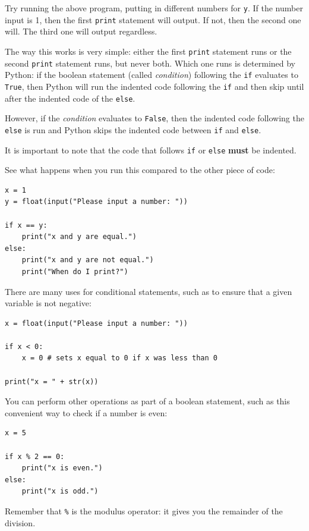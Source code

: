 \documentclass[11pt]{cselabheader}
\begin{document}
Try running the above program, putting in different numbers for \lstinline{y}.
If the number input is 1, then the first \lstinline!print! statement will
output. If not, then the second one will. The third one will output regardless.

The way this works is very simple: either the first \lstinline!print! statement
runs or the second \lstinline!print! statement runs, but never both. Which one
runs is determined by Python: if the boolean statement (called \emph{condition})
following the \lstinline!if! evaluates to \lstinline!True!, then Python will
run the indented code following the \lstinline!if! and then skip until after
the indented code of the \lstinline!else!.

However, if the \emph{condition} evaluates to \lstinline!False!, then the
indented code following the \lstinline!else! is run and Python skips the
indented code between \lstinline!if! and \lstinline!else!.

It is important to note that the code that follows \lstinline!if! or
\lstinline!else! \textbf{must} be indented.

See what happens when you run this compared to the other piece of code:
\begin{lstlisting}
x = 1
y = float(input("Please input a number: "))

if x == y:
    print("x and y are equal.")
else:
    print("x and y are not equal.")
    print("When do I print?")
\end{lstlisting}

There are many uses for conditional statements, such as to ensure that a given
variable is not negative:

\begin{lstlisting}[style=python]
x = float(input("Please input a number: "))

if x < 0:
    x = 0 # sets x equal to 0 if x was less than 0

print("x = " + str(x))
\end{lstlisting}

You can perform other operations as part of a boolean statement, such as this convenient way to check if a number is even:

\begin{lstlisting}[style=python]
x = 5

if x % 2 == 0:
    print("x is even.")
else:
    print("x is odd.")
\end{lstlisting}

Remember that \lstinline!%! 
is the modulus operator: it gives you the remainder of the division.
\end{document}
